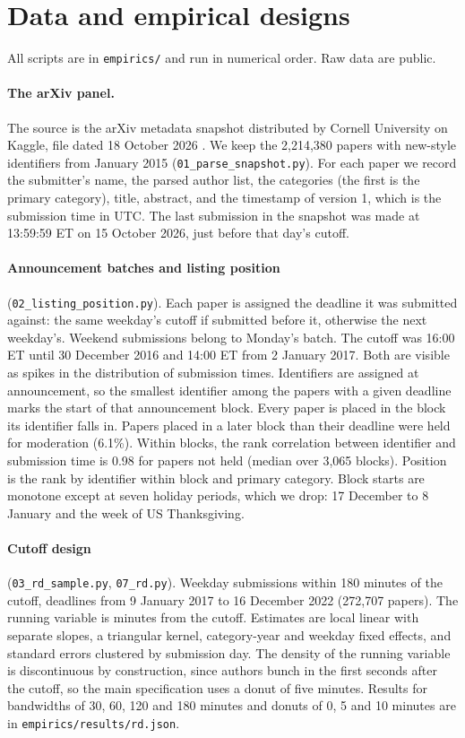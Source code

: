 \section{Data and empirical designs}\label{app:data}

All scripts are in \texttt{empirics/} and run in numerical order. Raw data are
public.

\paragraph{The arXiv panel.} The source is the arXiv metadata snapshot
distributed by Cornell University on Kaggle, file dated 18 October 2026
\citep{kaggle2026}. We keep the 2,214,380 papers with new-style identifiers from
January 2015 (\texttt{01\_parse\_snapshot.py}). For each paper we record the
submitter's name, the parsed author list, the categories (the first is the
primary category), title, abstract, and the timestamp of version 1, which is
the submission time in UTC. The last submission in the snapshot was made at
13:59:59 ET on 15 October 2026, just before that day's cutoff.

\paragraph{Announcement batches and listing position}
(\texttt{02\_listing\_position.py}). Each paper is assigned the deadline it was
submitted against: the same weekday's cutoff if submitted before it, otherwise
the next weekday's. Weekend submissions belong to Monday's batch. The cutoff was
16:00 ET until 30 December 2016 and 14:00 ET from 2 January 2017. Both are
visible as spikes in the distribution of submission times. Identifiers are
assigned at announcement, so the smallest identifier among the papers with a
given deadline marks the start of that announcement block. Every paper is
placed in the block its identifier falls in. Papers placed in a later block than
their deadline were held for moderation (6.1\%). Within blocks, the rank
correlation between identifier and submission time is 0.98 for papers not held
(median over 3,065 blocks). Position is the rank by identifier within block and
primary category. Block starts are monotone except at seven holiday periods,
which we drop: 17 December to 8 January and the week of US Thanksgiving.

\paragraph{Cutoff design} (\texttt{03\_rd\_sample.py}, \texttt{07\_rd.py}).
Weekday submissions within 180 minutes of the cutoff, deadlines from 9 January
2017 to 16 December 2022 (272,707 papers). The running variable is minutes from
the cutoff. Estimates are local linear with separate slopes, a triangular
kernel, category-year and weekday fixed effects, and standard errors clustered
by submission day. The density of the running variable is discontinuous by
construction, since authors bunch in the first seconds after the cutoff, so the
main specification uses a donut of five minutes. Results for bandwidths of 30,
60, 120 and 180 minutes and donuts of 0, 5 and 10 minutes are in
\texttt{empirics/results/rd.json}.

